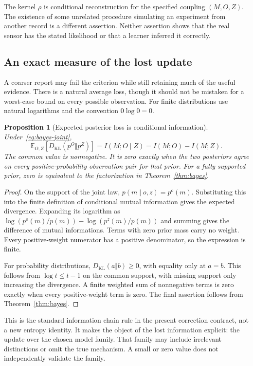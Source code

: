 \documentclass[11pt,letterpaper]{article}
\theoremstyle{plain}
\newtheorem{proposition}[theorem]{Proposition}
\theoremstyle{definition}
\begin{document}
The kernel $\rho$ is conditional reconstruction for the specified coupling $(M,O,Z)$. The existence of some unrelated procedure simulating an experiment from another record is a different assertion. Neither assertion shows that the real sensor has the stated likelihood or that a learner inferred it correctly.

\subsection{An exact measure of the lost update}
A coarser report may fail the criterion while still retaining much of the useful evidence. There is a natural average loss, though it should not be mistaken for a worst-case bound on every possible observation. For finite distributions use natural logarithms and the convention $0\log 0=0$.

\begin{proposition}[Expected posterior loss is conditional information]\label{prop:posterior-information}
Under~\eqref{eq:bayes-joint},
\begin{equation}\label{eq:posterior-kl}
\mathbb E_{O,Z}\!\left[D_{\mathrm{KL}}(p^O\Vert p^Z)\right]
=I(M;O\mid Z)=I(M;O)-I(M;Z).
\end{equation}
The common value is nonnegative. It is zero exactly when the two posteriors agree on every positive-probability observation pair for that prior. For a fully supported prior, zero is equivalent to the factorization in Theorem~\ref{thm:bayes}.
\end{proposition}
\begin{proof}
On the support of the joint law, $p(m\mid o,z)=p^o(m)$. Substituting this into the finite definition of conditional mutual information gives the expected divergence. Expanding its logarithm as $\log(p^o(m)/p(m))-\log(p^z(m)/p(m))$ and summing gives the difference of mutual informations. Terms with zero prior mass carry no weight. Every positive-weight numerator has a positive denominator, so the expression is finite.

For probability distributions, $D_{\mathrm{KL}}(a\Vert b)\geq0$, with equality only at $a=b$. This follows from $\log t\leq t-1$ on the common support, with missing support only increasing the divergence. A finite weighted sum of nonnegative terms is zero exactly when every positive-weight term is zero. The final assertion follows from Theorem~\ref{thm:bayes}.
\end{proof}

This is the standard information chain rule in the present correction contract, not a new entropy identity. It makes the object of the lost information explicit: the update over the chosen model family. That family may include irrelevant distinctions or omit the true mechanism. A small or zero value does not independently validate the family.
\end{document}

